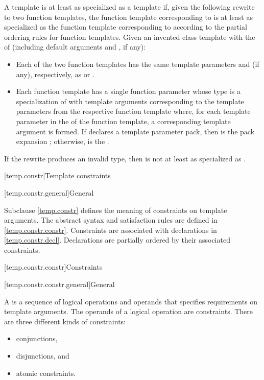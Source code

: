 \pnum
A template   is
at least as specialized as a template  
if, given the following rewrite to two function templates,
the function template corresponding to 
is at least as specialized as
the function template corresponding to 
according to the partial ordering rules
for function templates.
Given an invented class template 
with the  of  (including default arguments
and , if any):

\begin{itemize}
\item
Each of the two function templates has the same template parameters
and  (if any),
respectively, as  or .
\item
Each function template has a single function parameter
whose type is a specialization of 
with template arguments corresponding to the template parameters
from the respective function template where,
for each template parameter 
in the  of the function template,
a corresponding template argument  is formed.
If  declares a template parameter pack,
then  is the pack expansion ;
otherwise,  is the  .
\end{itemize}
If the rewrite produces an invalid type,
then  is not at least as specialized as .

[temp.constr]{Template constraints}

[temp.constr.general]{General}

\pnum
\begin{note}
Subclause \ref{temp.constr} defines the meaning of constraints on template arguments.
The abstract syntax and satisfaction rules are defined
in \ref{temp.constr.constr}.
Constraints are associated with declarations in \ref{temp.constr.decl}.
Declarations are partially ordered by their associated constraints.
\end{note}

[temp.constr.constr]{Constraints}

[temp.constr.constr.general]{General}

%

\pnum
A  is a sequence of logical operations and
operands that specifies requirements on template arguments.
The operands of a logical operation are constraints.
There are three different kinds of constraints:
\begin{itemize}
\item conjunctions,
\item disjunctions, and
\item atomic constraints.
\end{itemize}

